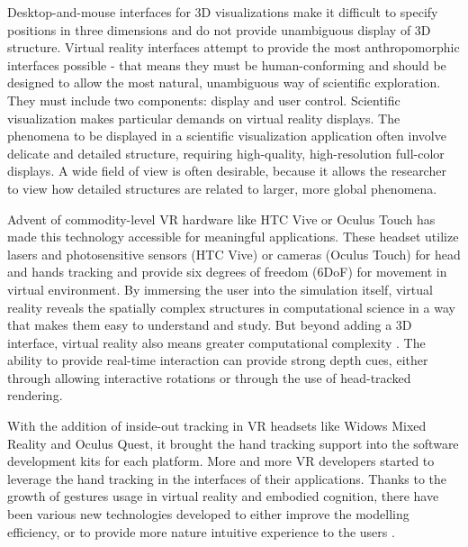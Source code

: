 Desktop-and-mouse interfaces for 3D visualizations make it difficult to specify positions in three dimensions and do not provide unambiguous display of 3D structure. Virtual reality interfaces attempt to provide the most anthropomorphic interfaces possible - that means they must be human-conforming and should be designed to allow the most natural, unambiguous way of scientific exploration. They must include two components: display and user control. Scientific visualization makes particular demands on virtual reality displays. The phenomena to be displayed in a scientific visualization application often involve delicate and detailed structure, requiring high-quality, high-resolution full-color displays. A wide field of view is often desirable, because it allows the researcher to view how detailed structures are related to larger, more global phenomena.

Advent of commodity-level VR hardware like HTC Vive or Oculus Touch has made this technology accessible for meaningful applications. These headset utilize lasers and photosensitive sensors (HTC Vive) or cameras (Oculus Touch) for head and hands tracking and provide six degrees of freedom (6DoF) for movement in virtual environment. By immersing the user into the simulation itself, virtual reality reveals the spatially complex structures in computational science in a way that makes them easy to understand and study. But beyond adding a 3D interface, virtual reality also means greater computational complexity \citep{brysonVirtualRealityScientific}. The ability to provide real-time interaction can provide strong depth cues, either through allowing interactive rotations or through the use of head-tracked rendering. 

With the addition of inside-out tracking in VR headsets like Widows Mixed Reality and Oculus Quest, it brought the hand tracking support into the software development kits for each platform. More and more VR developers started to leverage the hand tracking in the interfaces of their applications. Thanks to the growth of gestures usage in virtual reality and embodied cognition, there have been various new technologies developed to either improve the modelling efficiency, or to provide more nature intuitive experience to the users \citep{dangetiComparingBarehandinairGesture2016}.

